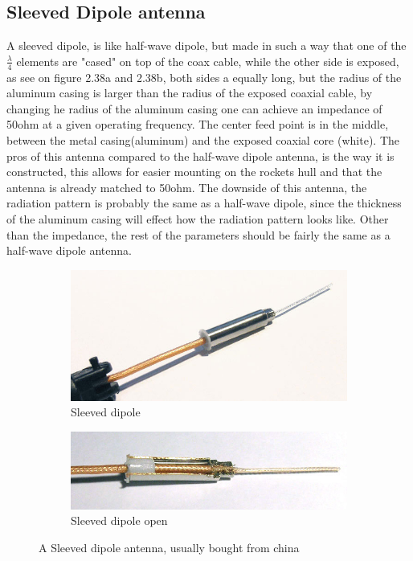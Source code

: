 \subsection{Sleeved Dipole antenna}
A sleeved dipole, is like half-wave dipole, but made in such a way that one of the $\frac{\lambda}{4}$ elements are "cased" on top of the coax cable, while the other side is exposed, as see on figure 2.38a and 2.38b, both sides a equally long, but the radius of the aluminum casing is larger than the radius of the exposed coaxial cable, by changing he radius of the aluminum casing one can achieve an impedance of 50ohm at a given operating frequency. The center feed point is in the middle, between the metal casing(aluminum) and the exposed coaxial core (white). The pros of this antenna compared to the half-wave dipole antenna, is the way it is constructed, this allows for easier mounting on the rockets hull and that the antenna is already matched to 50ohm. The downside of this antenna, the radiation pattern is probably the same as a half-wave dipole, since the thickness of the aluminum casing will effect how the radiation pattern looks like. Other than the impedance, the rest of the parameters should be fairly the same as a half-wave dipole antenna. 

\begin{figure}[h!]
  \centering
  \begin{subfigure}[b]{0.65\linewidth}
    \includegraphics[width=\linewidth]{figures/SleeveDipole.jpg}   
    \caption{Sleeved dipole}
    \end{subfigure}
  \begin{subfigure}[b]{0.65\linewidth}
    \includegraphics[width=\linewidth]{figures/SleeveDipoleOpen.jpg}
    \caption{Sleeved dipole open}
  \end{subfigure}
  \caption{A Sleeved dipole antenna, usually bought from china}
\end{figure}

